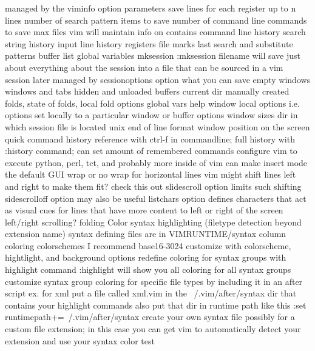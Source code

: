 \documentclass[12pt]{book}
\begin{document}
{      managed by the viminfo option parameters
        save lines for each register up to n lines
        number of search pattern items to save
        number of command line commands to save
        max files vim will maintain info on
      contains
        command line history
        search string history
        input line history
        registers
        file marks
        last search and substitute patterns
        buffer list
        global variables
    mksession
      :mksession filename will save just about everything about the session into a file that can be sourced in a vim session later
      managed by sessionoptions option
      what you can save
        empty windows
        windows and tabs
        hidden and unloaded buffers
        current dir
        manually created folds, state of folds, local fold options
        global vars
        help window
        local options i.e. options set locally to a particular window or buffer
        options
        window sizes
        dir in which session file is located
        unix end of line format
        window position on the screen
  quick command history reference with ctrl-f in commandline; full history with :history command; can set amount of remembered commands
  configure vim to execute python, perl, tct, and probably more inside of vim
  can make insert mode the default
GUI
  wrap or no wrap for horizontal lines
    vim might shift lines left and right to make them fit? check this out
    slidescroll option limits such shifting
    sidescrolloff option may also be useful
    listchars option defines characters that act as visual cues for lines that have more content to left or right of the screen
  left/right scrolling?
  folding
  Color
    syntax highlighting (filetype detection beyond extension name)
      syntax defining files are in VIMRUNTIME/syntax
    column coloring
    colorschemes
      I recommend base16-3024
      customize with colorscheme, hightlight, and background options
      redefine coloring for syntax groups with highlight command
      :highlight will show you all coloring for all syntax groups
      customize syntax group coloring for specific file types by including it in an after script
        ex. for xml put a file called xml.vim in the ~/.vim/after/syntax dir that contains your highlight commands
        also put that dir in runtime path like this :set runtimepath+=~/.vim/after/syntax
      create your own syntax file
        possibly for a custom file extension; in this case you can get vim to automatically detect your extension and use your syntax
    color test
}
\end{document}
